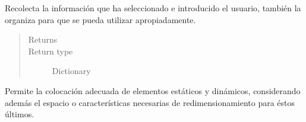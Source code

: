 \documentclass[letterpaper,10pt,english]{sphinxmanual}
\begin{document}
\begin{fulllineitems}
\begin{fulllineitems}
\begin{quote}
\begin{description}
\end{description}\end{quote}

\end{fulllineitems}


\begin{fulllineitems}
\label{View/Main/GeneticOperator/TemplateGeneticOperator/TemplateGeneticOperatorFrame:View.Main.GeneticOperator.TemplateGeneticOperator.TemplateGeneticOperatorFrame.TemplateGeneticOperatorFrame.get_information}
Recolecta la información que ha seleccionado e introducido el usuario,
también la organiza para que se pueda utilizar apropiadamente.
\begin{quote}\begin{description}
\item[{Returns}] \leavevmode



\item[{Return type}] \leavevmode
Dictionary

\end{description}\end{quote}

\end{fulllineitems}


\begin{fulllineitems}
\label{View/Main/GeneticOperator/TemplateGeneticOperator/TemplateGeneticOperatorFrame:View.Main.GeneticOperator.TemplateGeneticOperator.TemplateGeneticOperatorFrame.TemplateGeneticOperatorFrame.grid_widgets}
Permite la colocación adecuada de elementos estáticos y dinámicos, considerando
además el espacio o características necesarias de redimensionamiento para éstos últimos.

\end{fulllineitems}


\end{fulllineitems}
\end{document}
